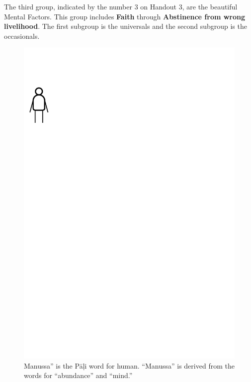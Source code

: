 The third group, indicated by the number 3 on Handout 3, are the beautiful Mental Factors. This group includes \textbf{Faith} through \textbf{Abstinence from wrong livelihood}. The first subgroup is the universals and the second subgroup is the occasionals.

\begin{figure}[h]
\centering
\includegraphics[width=1.0\linewidth]{./Diagrams/Key}
\caption{Manussa” is the Pāḷi word for human. “Manussa” is derived from the words for “abundance” and “mind.”}
\label{fig:Key}
\end{figure}

